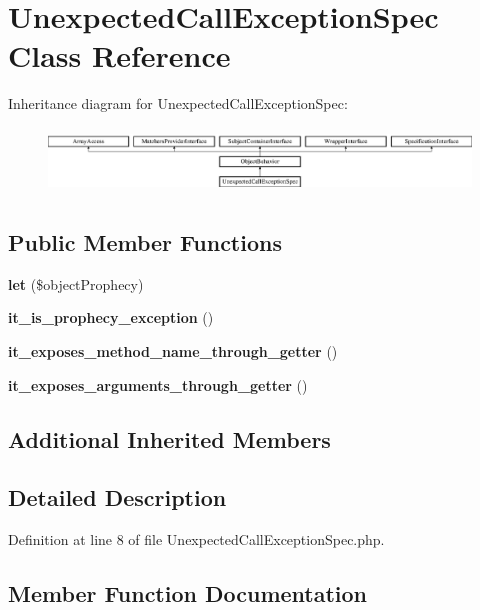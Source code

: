 \section{Unexpected\+Call\+Exception\+Spec Class Reference}
\label{classspec_1_1_prophecy_1_1_exception_1_1_call_1_1_unexpected_call_exception_spec}
Inheritance diagram for Unexpected\+Call\+Exception\+Spec\+:\begin{figure}[H]
\begin{center}
\leavevmode
\includegraphics[height=1.750000cm]{classspec_1_1_prophecy_1_1_exception_1_1_call_1_1_unexpected_call_exception_spec}
\end{center}
\end{figure}
\subsection*{Public Member Functions}
\begin{DoxyCompactItemize}
\item 
{\bf let} (\$object\+Prophecy)
\item 
{\bf it\+\_\+is\+\_\+prophecy\+\_\+exception} ()
\item 
{\bf it\+\_\+exposes\+\_\+method\+\_\+name\+\_\+through\+\_\+getter} ()
\item 
{\bf it\+\_\+exposes\+\_\+arguments\+\_\+through\+\_\+getter} ()
\end{DoxyCompactItemize}
\subsection*{Additional Inherited Members}


\subsection{Detailed Description}


Definition at line 8 of file Unexpected\+Call\+Exception\+Spec.\+php.



\subsection{Member Function Documentation}
